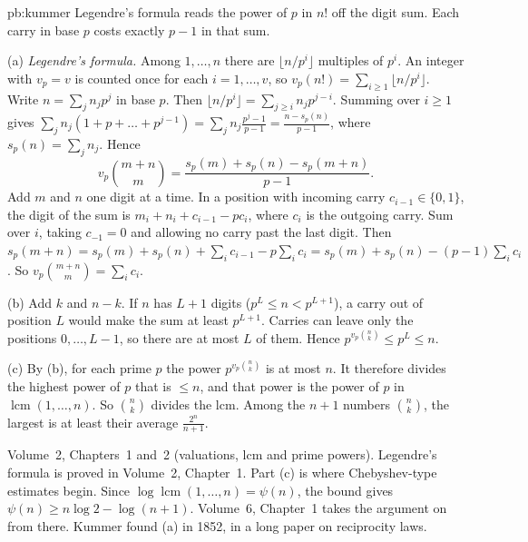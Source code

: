 \begin{solution}{pb:kummer}
\idea Legendre's formula reads the power of $p$ in $n!$ off the digit sum. Each carry in base $p$ costs exactly $p-1$ in that sum.

\writeup (a) \emph{Legendre's formula.} Among $1,\dots,n$ there are $\lfloor n/p^i\rfloor$ multiples of $p^i$. An integer with $v_p=v$ is counted once for each
$i=1,\dots,v$, so $v_p(n!)=\sum_{i\ge1}\lfloor n/p^i\rfloor$. Write $n=\sum_jn_jp^j$ in base $p$. Then $\lfloor n/p^i\rfloor=\sum_{j\ge i}n_jp^{j-i}$. Summing over $i\ge1$ gives
$\sum_jn_j(1+p+\dots+p^{j-1})=\sum_jn_j\frac{p^j-1}{p-1}=\frac{n-s_p(n)}{p-1}$, where $s_p(n)=\sum_jn_j$. Hence
\[
v_p\binom{m+n}m=\frac{s_p(m)+s_p(n)-s_p(m+n)}{p-1}.
\]
Add $m$ and $n$ one digit at a time. In a position with incoming carry $c_{i-1}\in\{0,1\}$, the digit of the sum is
$m_i+n_i+c_{i-1}-pc_i$, where $c_i$ is the outgoing carry. Sum over $i$, taking $c_{-1}=0$ and allowing no carry past the last digit. Then
$s_p(m+n)=s_p(m)+s_p(n)+\sum_ic_{i-1}-p\sum_ic_i=s_p(m)+s_p(n)-(p-1)\sum_ic_i$. So $v_p\binom{m+n}m=\sum_ic_i$.

(b) Add $k$ and $n-k$. If $n$ has $L+1$ digits ($p^L\le n<p^{L+1}$), a carry out of position $L$ would make the sum at least
$p^{L+1}$. Carries can leave only the positions $0,\dots,L-1$, so there are at most $L$ of them. Hence $p^{v_p\binom nk}\le p^L\le n$.

(c) By (b), for each prime $p$ the power $p^{v_p\binom nk}$ is at most $n$. It therefore divides the highest power of $p$ that is $\le n$,
and that power is the power of $p$ in $\operatorname{lcm}(1,\dots,n)$. So $\binom nk$ divides the lcm. Among the $n+1$ numbers
$\binom nk$, the largest is at least their average $\frac{2^n}{n+1}$.

\tools Volume~2, Chapters~1 and~2 (valuations, lcm and prime powers). Legendre's formula is proved in Volume~2, Chapter~1.
\leads Part (c) is where Chebyshev-type estimates begin. Since $\log\operatorname{lcm}(1,\dots,n)=\psi(n)$, the bound gives
$\psi(n)\ge n\log2-\log(n+1)$. Volume~6, Chapter~1 takes the argument on from there. Kummer found (a) in 1852, in a long paper on reciprocity laws.
\end{solution}

